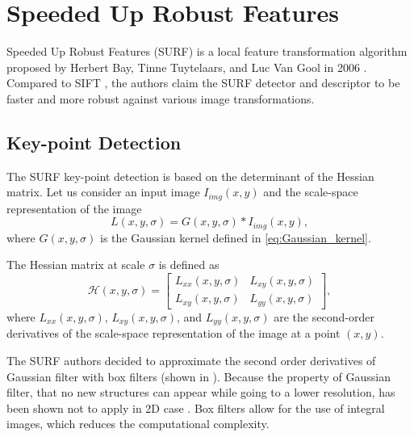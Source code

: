 \section{Speeded Up Robust Features}
Speeded Up Robust Features (SURF) is a local feature transformation algorithm proposed by Herbert Bay, Tinne Tuytelaars, and Luc Van Gool in 2006 \cite{Bay2006}. Compared to SIFT \cite{Lowe1999}, the authors claim the SURF detector and descriptor to be faster and more robust against various image transformations.

\subsection{Key-point Detection}
The SURF key-point detection is based on the determinant of the Hessian matrix. Let us consider an input image $I_{img}(x,y)$ and the scale-space representation of the image
\begin{equation}
    L(x, y,\sigma) =  G(x,y,\sigma)*I_{img}(x,y),
\end{equation}
where $G(x,y,\sigma)$ is the Gaussian kernel defined in \eqref{eq:Gaussian_kernel}.

The Hessian matrix at scale $\sigma$ is defined as
\begin{equation}
    \mathcal{H}(x, y, \sigma) =
    \begin{bmatrix}
        L_{xx}(x, y, \sigma) & L_{xy}(x, y, \sigma)\\
        L_{xy}(x, y, \sigma) & L_{yy}(x, y, \sigma)
    \end{bmatrix},
\end{equation}
where $L_{xx}(x, y, \sigma)$, $L_{xy}(x, y, \sigma)$, and $L_{yy}(x, y, \sigma)$ are the second-order derivatives of the scale-space representation of the image at a point $(x, y)$.

The SURF authors decided to approximate the second order derivatives of Gaussian filter with box filters (shown in ). Because the property of Gaussian filter, that no new structures can appear while going to a lower resolution, has been shown not to apply in 2D case \cite{Koenderink1984}. Box filters allow for the use of integral images, which reduces the computational complexity.

